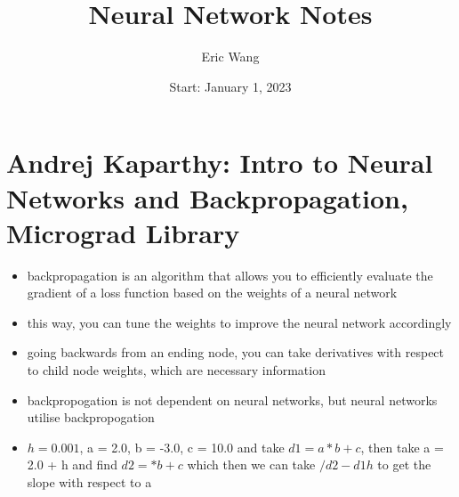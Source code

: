 \documentclass{article}
\title{Neural Network Notes}
\author{Eric Wang}
\date{Start: January 1, 2023}
\begin{document}
\maketitle
\newpage
\section{Andrej Kaparthy: Intro to Neural 
Networks and Backpropagation, Micrograd 
Library}

\begin{itemize}
    \item backpropagation is an algorithm that
allows you to efficiently evaluate the gradient
of a loss function based on the weights of
a neural network
    \item this way, you can tune the weights
to improve the neural network accordingly
    \item going backwards from an ending node,
you can take derivatives with respect to child
node weights, which are necessary information
    \item backpropogation is not dependent on
neural networks, but neural networks utilise
backpropogation
    \item $h = 0.001$, a = 2.0, b = -3.0, 
c = 10.0 and take $d1 = a*b + c$, then take
a = 2.0 + h and find $d2 = *b + c$ which 
then we can take $/{d2-d1}{h}$ to get the
slope with respect to a
\end{itemize}
\end{document}
